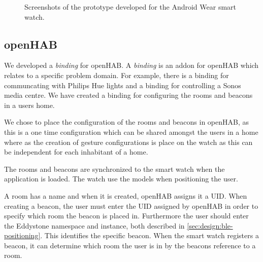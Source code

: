 \begin{figure}[!htb]
{    }
    \caption{Screenshots of the prototype developed for the Android Wear smart watch.}
    \label{fig:implementation:prototype:screenshots}
\end{figure}

\subsection{openHAB}
\label{sec:implementation:prototype:openhab}

We developed a \emph{binding} for openHAB. A \emph{binding} is an addon for openHAB which relates to a specific problem domain. For example, there is a binding for communcating with Philips Hue lights and a binding for controlling a Sonos media centre. We have created a binding for configuring the rooms and beacons in a users home.

We chose to place the configuration of the rooms and beacons in openHAB, as this is a one time configuration which can be shared amongst the users in a home where as the creation of gesture configurations is place on the watch as this can be independent for each inhabitant of a home.

The rooms and beacons are synchronized to the smart watch when the application is loaded. The watch use the models when positioning the user.

A room has a name and when it is created, openHAB assigns it a UID. When creating a beacon, the user must enter the UID assigned by openHAB in order to specify which room the beacon is placed in. Furthermore the user should enter the Eddystone namespace and instance, both described in \cref{sec:design:ble-positioning}. This identifies the specific beacon. When the smart watch registers a beacon, it can determine which room the user is in by the beacons reference to a room.

